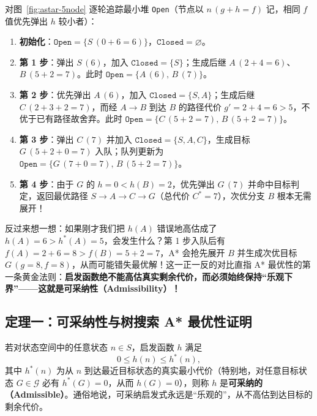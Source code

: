 对图~\ref{fig:astar-5node} 逐轮追踪最小堆 \texttt{Open}（节点以 $n\,(g{+}h{=}f)$ 记，相同 $f$ 值优先弹出 $h$ 较小者）：
\begin{enumerate}
  \item \textbf{初始化}：$\texttt{Open} = \{ S\,(0{+}6{=}6) \}$，$\texttt{Closed} = \varnothing$。
  \item \textbf{第 1 步}：弹出 $S\,(6)$，加入 $\texttt{Closed}=\{S\}$；生成后继 $A\,(2{+}4{=}6)$、$B\,(5{+}2{=}7)$。此时 $\texttt{Open} = \{ A\,(6),\, B\,(7) \}$。
  \item \textbf{第 2 步}：优先弹出 $A\,(6)$，加入 $\texttt{Closed}=\{S, A\}$；生成后继 $C\,(2{+}3{+}2{=}7)$，而经 $A\to B$ 到达 $B$ 的路径代价 $g'=2+4=6 > 5$，不优于已有路径故舍弃。此时 $\texttt{Open} = \{ C\,(5{+}2{=}7),\, B\,(5{+}2{=}7) \}$。
  \item \textbf{第 3 步}：弹出 $C\,(7)$ 并加入 $\texttt{Closed}=\{S, A, C\}$，生成目标 $G\,(5{+}2{+}0{=}7)$ 入队；队列更新为 $\texttt{Open} = \{ G\,(7{+}0{=}7),\allowbreak\, B\,(5{+}2{=}7) \}$。
  \item \textbf{第 4 步}：由于 $G$ 的 $h=0 < h(B)=2$，优先弹出 $G\,(7)$ 并命中目标判定，返回最优路径 $S\to A\to C\to G$（总代价 $C^*=7$），次优分支 $B$ 根本无需展开！
\end{enumerate}

反过来想一想：如果刚才我们把 $h(A)$ 错误地高估成了 $h(A)=6 > h^*(A)=5$，会发生什么？第 1 步入队后有 $f(A)=2+6=8 > f(B)=5+2=7$，A* 会抢先展开 $B$ 并生成次优目标 $G\,(g{=}8, f{=}8)$，从而可能错失最优解！这一正一反的对比直指 A* 最优性的第一条黄金法则：\textbf{启发函数绝不能高估真实剩余代价，而必须始终保持“乐观下界”——这就是可采纳性（Admissibility）！}

\subsection{定理一：可采纳性与树搜索 A* 最优性证明}

\begin{defBox}
\begin{definition}\label{def:admissible}
若对状态空间中的任意状态 $n \in S$，启发函数 $h$ 满足
\begin{equation}\label{eq:admissible}
  0 \le h(n) \le h^*(n),
\end{equation}
其中 $h^*(n)$ 为从 $n$ 到达最近目标状态的真实最小代价（特别地，对任意目标状态 $G\in\mathcal{G}$ 必有 $h^*(G)=0$，从而 $h(G)=0$），则称 $h$ 是\textbf{可采纳的（Admissible）}。通俗地说，可采纳启发式永远是“乐观的”，从不高估到达目标的剩余代价。
\end{definition}
\end{defBox}

